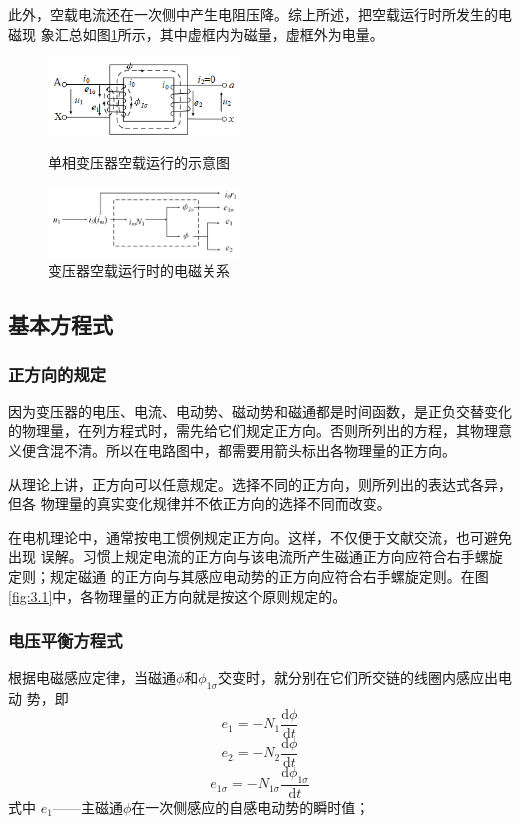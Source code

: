 \documentclass{book}
\begin{document}
此外，空载电流还在一次侧中产生电阻压降。综上所述，把空载运行时所发生的电磁现 象汇总如图\ref{fig:3.2}所示，其中虚框内为磁量，虚框外为电量。
\begin{figure}  %
	\begin{minipage}[H]{0.45\linewidth}  
		\centering  
		\includegraphics[width=2in]{3-1g.png}  
		\caption{单相变压器空载运行的示意图}
		\label{fig:3.1} 
	\end{minipage}
	\begin{minipage}[H]{0.45\linewidth}  
		\centering  
		\includegraphics[width=2in]{3-2gai.png}  
		\caption{变压器空载运行时的电磁关系} 
		\label{fig:3.2} 
	\end{minipage}
\end{figure} 
\subsection{基本方程式}
\subsubsection{正方向的规定}
因为变压器的电压、电流、电动势、磁动势和磁通都是时间函数，是正负交替变化的物理量，在列方程式时，需先给它们规定正方向。否则所列出的方程，其物理意义便含混不清。所以在电路图中，都需要用箭头标出各物理量的正方向。

从理论上讲，正方向可以任意规定。选择不同的正方向，则所列出的表达式各异，但各 物理量的真实变化规律并不依正方向的选择不同而改变。

在电机理论中，通常按电工惯例规定正方向。这样，不仅便于文献交流，也可避免出现 误解。习惯上规定电流的正方向与该电流所产生磁通正方向应符合右手螺旋定则；规定磁通 的正方向与其感应电动势的正方向应符合右手螺旋定则。在图\ref{fig:3.1}中，各物理量的正方向就是按这个原则规定的。
\subsubsection{电压平衡方程式}
根据电磁感应定律，当磁通$\phi$和${{\phi }_{1\sigma }}$交变时，就分别在它们所交链的线圈内感应出电动 势，即
\[{{e}_{1}}=-{{N}_{1}}\frac{\text{d}\phi }{\text{d}t}\]
\[{{e}_{2}}=-{{N}_{2}}\frac{\text{d}\phi }{\text{d}t}\]
\[{{e}_{1\sigma }}=-{{N}_{1\sigma }}\frac{\text{d}{{\phi }_{1\sigma }}}{\text{d}t}\]
式中   ${{e}_{1}}$——主磁通$\phi$在一次侧感应的自感电动势的瞬时值；
\end{document}

